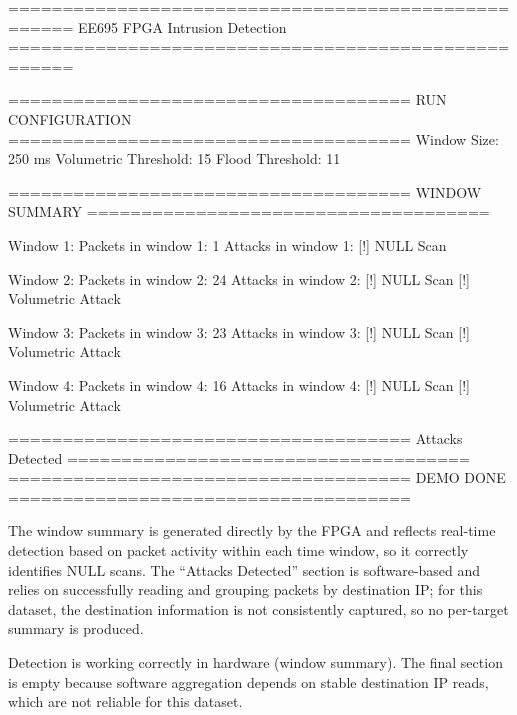 

====================================================
        EE695 FPGA Intrusion Detection 
====================================================


=====================================
RUN CONFIGURATION
=====================================
Window Size: 250 ms
Volumetric Threshold: 15
Flood Threshold: 11


=====================================
WINDOW SUMMARY
=====================================

Window 1:
Packets in window 1: 1
Attacks in window 1:
  [!] NULL Scan

Window 2:
Packets in window 2: 24
Attacks in window 2:
  [!] NULL Scan
  [!] Volumetric Attack

Window 3:
Packets in window 3: 23
Attacks in window 3:
  [!] NULL Scan
  [!] Volumetric Attack

Window 4:
Packets in window 4: 16
Attacks in window 4:
  [!] NULL Scan
  [!] Volumetric Attack


=====================================
Attacks Detected
=====================================
=====================================
             DEMO DONE
=====================================



The window summary is generated directly by the FPGA and reflects real-time detection based on packet activity within each time window, so it correctly identifies NULL scans.
The “Attacks Detected” section is software-based and relies on successfully reading and grouping packets by destination IP; for this dataset, the destination information is not consistently captured, so no per-target summary is produced.



Detection is working correctly in hardware (window summary). The final section is empty because software aggregation depends on stable destination IP reads, which are not reliable for this dataset.
